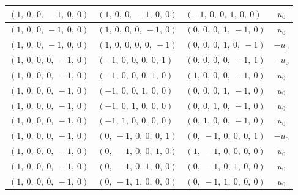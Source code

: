 \documentclass[11pt]{article}
\theoremstyle{definition}
\begin{document}
\begin{longtable}{|l|l|l|c|}
    \hline
    $\left( 1, \  0, \  0, \  -1, \  0, \  0\right)$ & $\left( 1, \  0, \  0, \  -1, \  0, \  0\right)$ & $\left( -1, \  0, \  0, \  1, \  0, \  0\right)$ & $u_{0}$ \\
    \hline
    $\left( 1, \  0, \  0, \  -1, \  0, \  0\right)$ & $\left( 1, \  0, \  0, \  0, \  -1, \  0\right)$ & $\left( 0, \  0, \  0, \  1, \  -1, \  0\right)$ & $u_{0}$ \\
    \hline
    $\left( 1, \  0, \  0, \  -1, \  0, \  0\right)$ & $\left( 1, \  0, \  0, \  0, \  0, \  -1\right)$ & $\left( 0, \  0, \  0, \  1, \  0, \  -1\right)$ & $- u_{0}$ \\
    \hline
    $\left( 1, \  0, \  0, \  0, \  -1, \  0\right)$ & $\left( -1, \  0, \  0, \  0, \  0, \  1\right)$ & $\left( 0, \  0, \  0, \  0, \  -1, \  1\right)$ & $- u_{0}$ \\
    \hline
    $\left( 1, \  0, \  0, \  0, \  -1, \  0\right)$ & $\left( -1, \  0, \  0, \  0, \  1, \  0\right)$ & $\left( 1, \  0, \  0, \  0, \  -1, \  0\right)$ & $u_{0}$ \\
    \hline
    $\left( 1, \  0, \  0, \  0, \  -1, \  0\right)$ & $\left( -1, \  0, \  0, \  1, \  0, \  0\right)$ & $\left( 0, \  0, \  0, \  1, \  -1, \  0\right)$ & $u_{0}$ \\
    \hline
    $\left( 1, \  0, \  0, \  0, \  -1, \  0\right)$ & $\left( -1, \  0, \  1, \  0, \  0, \  0\right)$ & $\left( 0, \  0, \  1, \  0, \  -1, \  0\right)$ & $u_{0}$ \\
    \hline
    $\left( 1, \  0, \  0, \  0, \  -1, \  0\right)$ & $\left( -1, \  1, \  0, \  0, \  0, \  0\right)$ & $\left( 0, \  1, \  0, \  0, \  -1, \  0\right)$ & $u_{0}$ \\
    \hline
    $\left( 1, \  0, \  0, \  0, \  -1, \  0\right)$ & $\left( 0, \  -1, \  0, \  0, \  0, \  1\right)$ & $\left( 0, \  -1, \  0, \  0, \  0, \  1\right)$ & $- u_{0}$ \\
    \hline
    $\left( 1, \  0, \  0, \  0, \  -1, \  0\right)$ & $\left( 0, \  -1, \  0, \  0, \  1, \  0\right)$ & $\left( 1, \  -1, \  0, \  0, \  0, \  0\right)$ & $u_{0}$ \\
    \hline
    $\left( 1, \  0, \  0, \  0, \  -1, \  0\right)$ & $\left( 0, \  -1, \  0, \  1, \  0, \  0\right)$ & $\left( 0, \  -1, \  0, \  1, \  0, \  0\right)$ & $u_{0}$ \\
    \hline
    $\left( 1, \  0, \  0, \  0, \  -1, \  0\right)$ & $\left( 0, \  -1, \  1, \  0, \  0, \  0\right)$ & $\left( 0, \  -1, \  1, \  0, \  0, \  0\right)$ & $u_{0}$ \\

\end{longtable}
\end{document}
